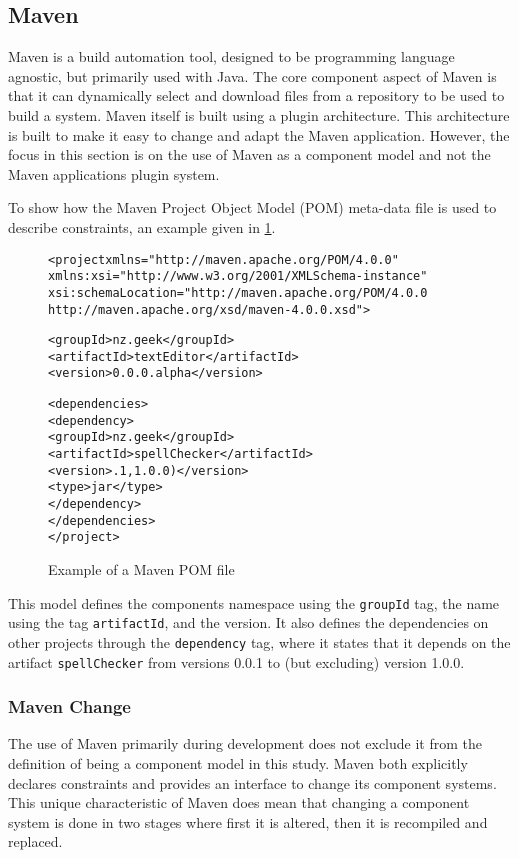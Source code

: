 \subsection{Maven}
Maven is a build automation tool, designed to be programming language agnostic, but primarily used with Java.
The core component aspect of Maven is that it can dynamically select and download files from a repository to be used to build a system.
Maven itself is built using a plugin architecture.
This architecture is built to make it easy to change and adapt the Maven application.
However, the focus in this section is on the use of Maven as a component model and not the Maven applications plugin system.

To show how the Maven Project Object Model (POM) meta-data file is used to describe constraints,
 an example given in \ref{mavenmetadata}. 

\begin{figure}[htp]
\begin{center}
\begin{alltt}
<project xmlns="http://maven.apache.org/POM/4.0.0"
  xmlns:xsi="http://www.w3.org/2001/XMLSchema-instance"
  xsi:schemaLocation="http://maven.apache.org/POM/4.0.0
                      http://maven.apache.org/xsd/maven-4.0.0.xsd">

  <groupId>nz.geek</groupId>
  <artifactId>textEditor</artifactId>
  <version>0.0.0.alpha</version>

  <dependencies>
    <dependency>
      <groupId>nz.geek</groupId>
      <artifactId>spellChecker</artifactId>
      <version>.1,1.0.0)</version>
      <type>jar</type>
     </dependency>
  </dependencies>
</project>
\end{alltt}
  \caption[Maven POM file]{Example of a Maven POM file}
  \label{mavenmetadata}
\end{center}
\end{figure}

This model defines the components namespace using the \texttt{groupId} tag, the name using the tag \texttt{artifactId}, and the version.
It also defines the dependencies on other projects through the \texttt{dependency} tag,
where it states that it depends on the artifact \texttt{spellChecker} from versions 0.0.1 to (but excluding) version 1.0.0.

\subsubsection{Maven Change}
The use of Maven primarily during development does not exclude it from the definition of being a component model in this study.
Maven both explicitly declares constraints and provides an interface to change its component systems. 
This unique characteristic of Maven does mean that changing a component system is done in two stages where first it is altered, then it is recompiled and replaced.

